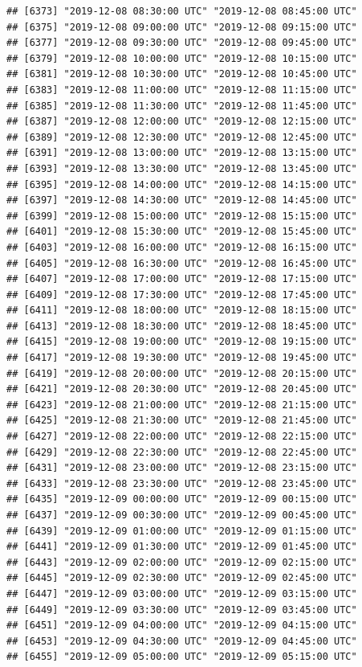 \documentclass{article}\usepackage[]{graphicx}\usepackage[]{color}
\makeatletter
\newenvironment{kframe}{%
 \def\at@end@of@kframe{}%
 \ifinner\ifhmode%
  \def\at@end@of@kframe{\end{minipage}}%
  \begin{minipage}{\columnwidth}%
 \fi\fi%
 \def\FrameCommand##1{\hskip\@totalleftmargin \hskip-\fboxsep
 \colorbox{shadecolor}{##1}\hskip-\fboxsep
     \hskip-\linewidth \hskip-\@totalleftmargin \hskip\columnwidth}%
 \MakeFramed {\advance\hsize-\width
   \@totalleftmargin\z@ \linewidth\hsize
   \@setminipage}}%
 {\par\unskip\endMakeFramed%
 \at@end@of@kframe}
\newenvironment{knitrout}{}{} %
\makeatother
\begin{document}
\begin{knitrout}
\begin{kframe}
\begin{verbatim}
## [6373] "2019-12-08 08:30:00 UTC" "2019-12-08 08:45:00 UTC"
## [6375] "2019-12-08 09:00:00 UTC" "2019-12-08 09:15:00 UTC"
## [6377] "2019-12-08 09:30:00 UTC" "2019-12-08 09:45:00 UTC"
## [6379] "2019-12-08 10:00:00 UTC" "2019-12-08 10:15:00 UTC"
## [6381] "2019-12-08 10:30:00 UTC" "2019-12-08 10:45:00 UTC"
## [6383] "2019-12-08 11:00:00 UTC" "2019-12-08 11:15:00 UTC"
## [6385] "2019-12-08 11:30:00 UTC" "2019-12-08 11:45:00 UTC"
## [6387] "2019-12-08 12:00:00 UTC" "2019-12-08 12:15:00 UTC"
## [6389] "2019-12-08 12:30:00 UTC" "2019-12-08 12:45:00 UTC"
## [6391] "2019-12-08 13:00:00 UTC" "2019-12-08 13:15:00 UTC"
## [6393] "2019-12-08 13:30:00 UTC" "2019-12-08 13:45:00 UTC"
## [6395] "2019-12-08 14:00:00 UTC" "2019-12-08 14:15:00 UTC"
## [6397] "2019-12-08 14:30:00 UTC" "2019-12-08 14:45:00 UTC"
## [6399] "2019-12-08 15:00:00 UTC" "2019-12-08 15:15:00 UTC"
## [6401] "2019-12-08 15:30:00 UTC" "2019-12-08 15:45:00 UTC"
## [6403] "2019-12-08 16:00:00 UTC" "2019-12-08 16:15:00 UTC"
## [6405] "2019-12-08 16:30:00 UTC" "2019-12-08 16:45:00 UTC"
## [6407] "2019-12-08 17:00:00 UTC" "2019-12-08 17:15:00 UTC"
## [6409] "2019-12-08 17:30:00 UTC" "2019-12-08 17:45:00 UTC"
## [6411] "2019-12-08 18:00:00 UTC" "2019-12-08 18:15:00 UTC"
## [6413] "2019-12-08 18:30:00 UTC" "2019-12-08 18:45:00 UTC"
## [6415] "2019-12-08 19:00:00 UTC" "2019-12-08 19:15:00 UTC"
## [6417] "2019-12-08 19:30:00 UTC" "2019-12-08 19:45:00 UTC"
## [6419] "2019-12-08 20:00:00 UTC" "2019-12-08 20:15:00 UTC"
## [6421] "2019-12-08 20:30:00 UTC" "2019-12-08 20:45:00 UTC"
## [6423] "2019-12-08 21:00:00 UTC" "2019-12-08 21:15:00 UTC"
## [6425] "2019-12-08 21:30:00 UTC" "2019-12-08 21:45:00 UTC"
## [6427] "2019-12-08 22:00:00 UTC" "2019-12-08 22:15:00 UTC"
## [6429] "2019-12-08 22:30:00 UTC" "2019-12-08 22:45:00 UTC"
## [6431] "2019-12-08 23:00:00 UTC" "2019-12-08 23:15:00 UTC"
## [6433] "2019-12-08 23:30:00 UTC" "2019-12-08 23:45:00 UTC"
## [6435] "2019-12-09 00:00:00 UTC" "2019-12-09 00:15:00 UTC"
## [6437] "2019-12-09 00:30:00 UTC" "2019-12-09 00:45:00 UTC"
## [6439] "2019-12-09 01:00:00 UTC" "2019-12-09 01:15:00 UTC"
## [6441] "2019-12-09 01:30:00 UTC" "2019-12-09 01:45:00 UTC"
## [6443] "2019-12-09 02:00:00 UTC" "2019-12-09 02:15:00 UTC"
## [6445] "2019-12-09 02:30:00 UTC" "2019-12-09 02:45:00 UTC"
## [6447] "2019-12-09 03:00:00 UTC" "2019-12-09 03:15:00 UTC"
## [6449] "2019-12-09 03:30:00 UTC" "2019-12-09 03:45:00 UTC"
## [6451] "2019-12-09 04:00:00 UTC" "2019-12-09 04:15:00 UTC"
## [6453] "2019-12-09 04:30:00 UTC" "2019-12-09 04:45:00 UTC"
## [6455] "2019-12-09 05:00:00 UTC" "2019-12-09 05:15:00 UTC"

\end{verbatim}
\end{kframe}
\end{knitrout}
\end{document}
